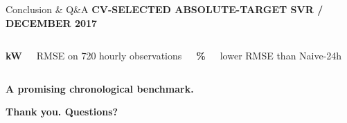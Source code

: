 \documentclass[aspectratio=169]{beamer}
\newcommand{\tagline}[1]{{\color{Blue}\fontsize{9}{11}\selectfont\bfseries #1}\par\vspace{1mm}}
\newcommand{\metric}[2]{{\color{Blue}\fontsize{25}{29}\selectfont\bfseries #1}\par{\small #2}\par}
\begin{document}
\begin{frame}{Conclusion \& Q\&A}
\vspace{6mm}
\tagline{CV-SELECTED ABSOLUTE-TARGET SVR \quad / \quad DECEMBER 2017}
\vspace{4mm}
\begin{columns}[c,onlytextwidth]
\metric{\TestRMSE{} kW}{RMSE on 720 hourly observations}
\metric{\GainDaily\%}{lower RMSE than Naive-24h}
\end{columns}
\vspace{8mm}
\textbf{A promising chronological benchmark.}\par
\vspace{7mm}
{\color{Blue}\fontsize{17}{21}\selectfont\bfseries Thank you. Questions?}
\end{frame}
\end{document}
